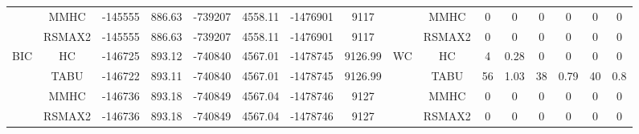 \begin{table}[p]
{\begin{tabular}{cc||cc|cc|cc||cc|cc|cc|cc}
& MMHC &	-145555 & 	886.63 & 	-739207 & 	4558.11 & 	-1476901 & 	9117 & 	& MMHC &	0 & 	0 & 	0 & 	0 & 	0 & 	0\tabularnewline													
& RSMAX2 &	-145555 & 	886.63 & 	-739207 & 	4558.11 & 	-1476901 & 	9117 & 	& RSMAX2 &	0 & 	0 & 	0 & 	0 & 	0 & 	0\tabularnewline													
\hline																										
\multirow{4}{*}{BIC} & HC &	-146725 & 	893.12 & 	-740840 & 	4567.01 & 	-1478745 & 	9126.99 & 	\multirow{4}{*}{WC} & HC &	4 & 	0.28 & 	0 & 	0 & 	0 & 	0\tabularnewline													
& TABU &	-146722 & 	893.11 & 	-740840 & 	4567.01 & 	-1478745 & 	9126.99 & 	& TABU &	56 & 	1.03 & 	38 & 	0.79 & 	40 & 	0.8\tabularnewline													
& MMHC &	-146736 & 	893.18 & 	-740849 & 	4567.04 & 	-1478746 & 	9127 & 	& MMHC &	0 & 	0 & 	0 & 	0 & 	0 & 	0\tabularnewline													
& RSMAX2 &	-146736 & 	893.18 & 	-740849 & 	4567.04 & 	-1478746 & 	9127 & 	& RSMAX2 &	0 & 	0 & 	0 & 	0 & 	0 & 	0\tabularnewline													
\hline																										
\end{tabular}																										
}																										
\end{table}																										


